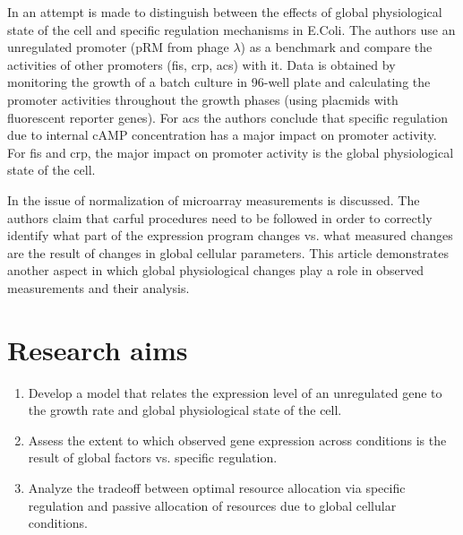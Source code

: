 \documentclass{report}
\begin{document}
In \cite{Berthoumieux2013} an attempt is made to distinguish between the effects of global physiological state of the cell and specific regulation mechanisms in E.Coli.
The authors use an unregulated promoter (pRM from phage $\lambda$) as a benchmark and compare the activities of other promoters (fis, crp, acs) with it.
Data is obtained by monitoring the growth of a batch culture in 96-well plate and calculating the promoter activities throughout the growth phases (using placmids with fluorescent reporter genes).
For acs the authors conclude that specific regulation due to internal cAMP concentration has a major impact on promoter activity.
For fis and crp, the major impact on promoter activity is the global physiological state of the cell.

In \cite{loven2012} the issue of normalization of microarray measurements is discussed.
The authors claim that carful procedures need to be followed in order to correctly identify what part of the expression program changes vs. what measured changes are the result of changes in global cellular parameters.
This article demonstrates another aspect in which global physiological changes play a role in observed measurements and their analysis.

\section{Research aims}
\begin{enumerate}
\item Develop a model that relates the expression level of an unregulated gene to the growth rate and global physiological state of the cell.
\item Assess the extent to which observed gene expression across conditions is the result of global factors vs. specific regulation.
\item Analyze the tradeoff between optimal resource allocation via specific regulation and passive allocation of resources due to global cellular conditions.
\end{enumerate}
\end{document}
